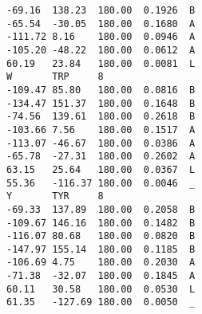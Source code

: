 \begin{small}
\begin{verbatim}
-69.16  138.23  180.00  0.1926  B
-65.54  -30.05  180.00  0.1680  A
-111.72 8.16    180.00  0.0946  A
-105.20 -48.22  180.00  0.0612  A
60.19   23.84   180.00  0.0081  L
W       TRP     8
-109.47 85.80   180.00  0.0816  B
-134.47 151.37  180.00  0.1648  B
-74.56  139.61  180.00  0.2618  B
-103.66 7.56    180.00  0.1517  A
-113.07 -46.67  180.00  0.0386  A
-65.78  -27.31  180.00  0.2602  A
63.15   25.64   180.00  0.0367  L
55.36   -116.37 180.00  0.0046  _
Y       TYR     8
-69.33  137.89  180.00  0.2058  B
-109.67 146.16  180.00  0.1482  B
-116.07 80.68   180.00  0.0820  B
-147.97 155.14  180.00  0.1185  B
-106.69 4.75    180.00  0.2030  A
-71.38  -32.07  180.00  0.1845  A
60.11   30.58   180.00  0.0530  L
61.35   -127.69 180.00  0.0050  _
\end{verbatim}
\end{small}

